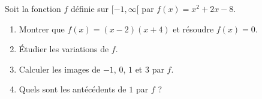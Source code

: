 
\begin{exercice}\label{exosmath-0655}

    Soit la fonction \( f\) définie sur \( \mathopen[ -1 , \infty [\) par \( f(x)=x^2+2x-8\).
        \begin{enumerate}
            \item
                Montrer que \( f(x)=(x-2)(x+4)\) et résoudre \( f(x)=0\).
            \item
                Étudier les variations de \( f\).
            \item
                Calculer les images de \( -1\), \( 0\), \( 1\) et \( 3\) par \( f\).
            \item
                Quels sont les antécédents de \( 1\) par \( f\) ?
        \end{enumerate}

\end{exercice}

